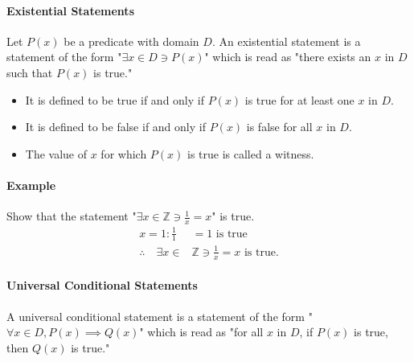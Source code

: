 \paragraph*{Existential Statements}
Let $P(x)$ be a predicate with domain $D$. An existential statement is a statement of the form
"$\exists x \in D \ni P(x)$" which is read as "there exists an $x$ in $D$ such that $P(x)$ is true."
\begin{itemize}
    \item It is defined to be true if and only if $P(x)$ is true for at least one $x$ in $D$.
    \item It is defined to be false if and only if $P(x)$ is false for all $x$ in $D$.
    \item The value of $x$ for which $P(x)$ is true is called a witness.
\end{itemize}

\paragraph*{Example}
Show that the statement "$\exists x \in \mathbb{Z} \ni \frac{1}{x} = x$" is true.
\begin{align*}
    x = 1: \frac{1}{1} &= 1 \text{ is true}\\
    \therefore \quad \exists x \in &\mathbb{Z} \ni \frac{1}{x} = x \text{ is true.}
\end{align*}

\paragraph*{Universal Conditional Statements}
A universal conditional statement is a statement of the form "$\forall x \in D, P(x) \implies Q(x)$" 
which is read as "for all $x$ in $D$, if $P(x)$ is true, then $Q(x)$ is true."

